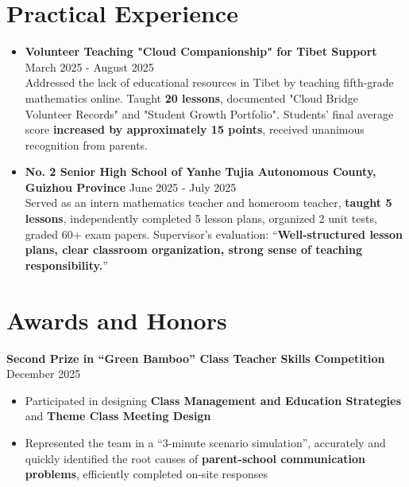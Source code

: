 	\section{\makebox[\widthof{\faGraduationCap}][c]{\color{WHU_Blue}{\faUniversity}}\quad Practical Experience}
	\begin{itemize}
		\item \textbf{Volunteer Teaching "Cloud Companionship" for Tibet Support} \hfill March 2025 - August 2025 \\
		Addressed the lack of educational resources in Tibet by teaching fifth-grade mathematics online. Taught \textbf{20 lessons}, documented "Cloud Bridge Volunteer Records" and "Student Growth Portfolio". Students' final average score \textbf{increased by approximately 15 points}, received unanimous recognition from parents.
		
		\item \textbf{No. 2 Senior High School of Yanhe Tujia Autonomous County, Guizhou Province} \hfill June 2025 - July 2025 \\
		Served as an intern mathematics teacher and homeroom teacher, \textbf{taught 5 lessons}, independently completed 5 lesson plans, organized 2 unit tests, graded 60+ exam papers. Supervisor's evaluation: “\textbf{Well-structured lesson plans, clear classroom organization, strong sense of teaching responsibility.}”
	\end{itemize}
	
	
	\section{\makebox[\widthof{\faGraduationCap}][c]{\color{WHU_Blue}{\faTrophy}}\quad Awards and Honors}
	
	\textbf{Second Prize in “Green Bamboo” Class Teacher Skills Competition} \hfill December 2025%
	\begin{itemize}
		\item Participated in designing \textbf{Class Management and Education Strategies} and \textbf{Theme Class Meeting Design}
		\item Represented the team in a “3-minute scenario simulation”, accurately and quickly identified the root causes of \textbf{parent-school communication problems}, efficiently completed on-site responses
	\end{itemize}
	
	
	
